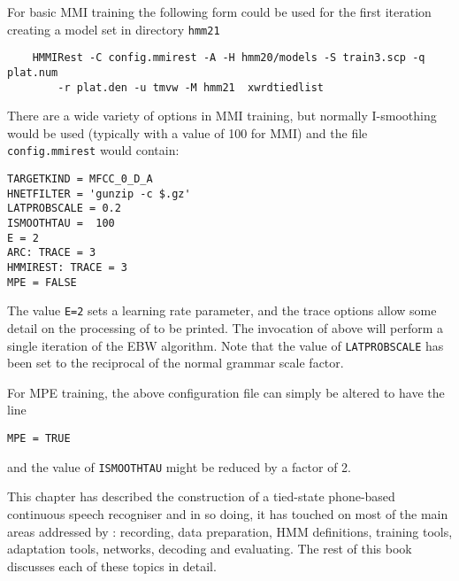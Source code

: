 For basic MMI training the following form could be used for the first iteration creating a model set in directory \texttt{hmm21}
\begin{verbatim}
    HMMIRest -C config.mmirest -A -H hmm20/models -S train3.scp -q plat.num 
        -r plat.den -u tmvw -M hmm21  xwrdtiedlist
\end{verbatim}
There are a wide variety of options in MMI training, but normally I-smoothing 
 would be used (typically with a value of 100 for MMI) and the file \texttt{config.mmirest}
would contain:
\begin{verbatim}
TARGETKIND = MFCC_0_D_A
HNETFILTER = 'gunzip -c $.gz'
LATPROBSCALE = 0.2
ISMOOTHTAU =  100
E = 2
ARC: TRACE = 3
HMMIREST: TRACE = 3
MPE = FALSE

\end{verbatim}
The value \texttt{E=2} sets a learning rate parameter, and the trace options
allow some detail on the processing of  to be printed.  The
invocation of  above will perform a single iteration of the
EBW algorithm.  Note that the value of \texttt{LATPROBSCALE} has been set to
the reciprocal of the normal grammar scale factor.

For MPE training, the above configuration file can simply be altered to have the line 
\begin{verbatim}           
MPE = TRUE
\end{verbatim}
and the value of \texttt{ISMOOTHTAU} might be reduced by a factor of 2.

This chapter has described the construction of a tied-state phone-based
continuous speech recogniser and in so doing, it has touched on most of the
main areas addressed by \HTK: recording, data preparation, HMM definitions,
training tools, adaptation tools, networks, decoding and evaluating.  The 
rest of this book discusses each of these topics in detail.



